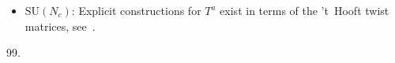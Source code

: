 \begin{itemize}
\begin{itemize}
\begin{align*}
\begin{aligned}
& \lambda^{4}= \begin{pmatrix}  0 &  & 1 \\ & 0 & \\ 1 & & 0 \\ \end{pmatrix}\,, \qquad
\lambda^{5}= \begin{pmatrix}  0 &  & -\i\\ & 0 & \\ \i& & 0 \\ \end{pmatrix}\,, \qquad
\lambda^{6}= \begin{pmatrix}  0 &  &  \\ & 0 &1 \\  & 1 & 0 \\ \end{pmatrix}\,,  \\
& \lambda^{7}= \begin{pmatrix}  0 &  &  \\ & 0 &-\i\\  & \i& 0 \\ \end{pmatrix}\,, \qquad
\lambda^{8}= \frac{1}{\sqrt{3}}\begin{pmatrix}  1 &  &  \\ & 1 & \\  &  & -2 \\ \end{pmatrix}\,.
\end{aligned}
\end{align*}
The omitted entries in the above are $0$.
\smallskip
\item $\text{SU}(N_c)$: Explicit constructions for $T^{a}$ exist in terms of the 't~Hooft twist matrices, see~\cite{ch6-'tHooft:1981sz}.
\end{itemize}

\end{itemize}

\begin{thebibliography}{99.}

\end{thebibliography}


